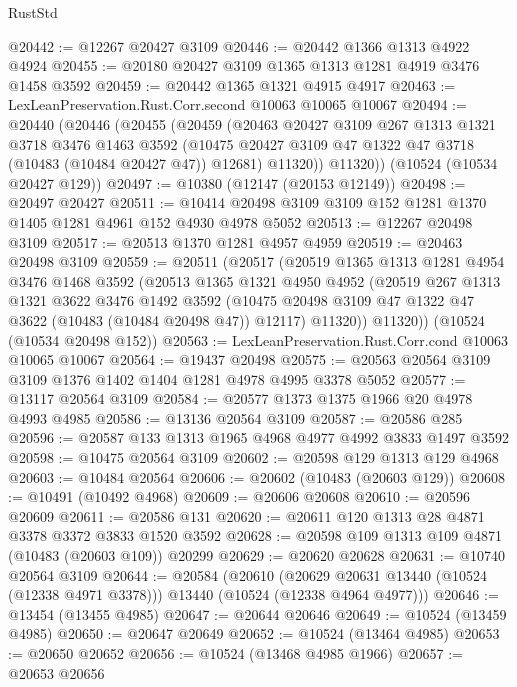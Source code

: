 \begin{lexlean}{RustStd}
\begin{coremodule}
@20442 := @12267 @20427 @3109
@20446 := @20442 @1366 @1313 @4922 @4924
@20455 := @20180 @20427 @3109 @1365 @1313 @1281 @4919 @3476 @1458 @3592
@20459 := @20442 @1365 @1321 @4915 @4917
@20463 := LexLeanPreservation.Rust.Corr.second @10063 @10065 @10067
@20494 := @20440
    (@20446
      (@20455
        (@20459
          (@20463
            @20427
            @3109
            @267
            @1313
            @1321
            @3718
            @3476
            @1463
            @3592
            (@10475 @20427 @3109 @47 @1322 @47 @3718 (@10483 (@10484 @20427 @47)) @12681)
            @11320))
        @11320))
    (@10524 (@10534 @20427 @129))
@20497 := @10380 (@12147 (@20153 @12149))
@20498 := @20497 @20427
@20511 := @10414 @20498 @3109 @3109 @152 @1281 @1370 @1405 @1281 @4961 @152 @4930 @4978 @5052
@20513 := @12267 @20498 @3109
@20517 := @20513 @1370 @1281 @4957 @4959
@20519 := @20463 @20498 @3109
@20559 := @20511
    (@20517
      (@20519
        @1365
        @1313
        @1281
        @4954
        @3476
        @1468
        @3592
        (@20513
          @1365
          @1321
          @4950
          @4952
          (@20519
            @267
            @1313
            @1321
            @3622
            @3476
            @1492
            @3592
            (@10475 @20498 @3109 @47 @1322 @47 @3622 (@10483 (@10484 @20498 @47)) @12117)
            @11320))
        @11320))
    (@10524 (@10534 @20498 @152))
@20563 := LexLeanPreservation.Rust.Corr.cond @10063 @10065 @10067
@20564 := @19437 @20498
@20575 := @20563 @20564 @3109 @3109 @1376 @1402 @1404 @1281 @4978 @4995 @3378 @5052
@20577 := @13117 @20564 @3109
@20584 := @20577 @1373 @1375 @1966 @20 @4978 @4993 @4985
@20586 := @13136 @20564 @3109
@20587 := @20586 @285
@20596 := @20587 @133 @1313 @1965 @4968 @4977 @4992 @3833 @1497 @3592
@20598 := @10475 @20564 @3109
@20602 := @20598 @129 @1313 @129 @4968
@20603 := @10484 @20564
@20606 := @20602 (@10483 (@20603 @129))
@20608 := @10491 (@10492 @4968)
@20609 := @20606 @20608
@20610 := @20596 @20609
@20611 := @20586 @131
@20620 := @20611 @120 @1313 @28 @4871 @3378 @3372 @3833 @1520 @3592
@20628 := @20598 @109 @1313 @109 @4871 (@10483 (@20603 @109)) @20299
@20629 := @20620 @20628
@20631 := @10740 @20564 @3109
@20644 := @20584
    (@20610
      (@20629 @20631 @13440 (@10524 (@12338 @4971 @3378)))
      @13440
      (@10524 (@12338 @4964 @4977)))
@20646 := @13454 (@13455 @4985)
@20647 := @20644 @20646
@20649 := @10524 (@13459 @4985)
@20650 := @20647 @20649
@20652 := @10524 (@13464 @4985)
@20653 := @20650 @20652
@20656 := @10524 (@13468 @4985 @1966)
@20657 := @20653 @20656

\end{coremodule}
\end{lexlean}
